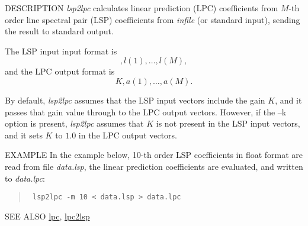 \begin{synopsis}
\item [lsp2lpc] [ --m $M$ ] [ --s $S$ ] [ --k ] [ --L ] [ --q $Q$ ] [ {\em infile} ] 
\end{synopsis}

\begin{qsection}{DESCRIPTION}
{\em lsp2lpc} calculates linear prediction (LPC) coefficients 
from $M$-th order line spectral pair (LSP) coefficients 
from {\em infile} (or standard input),
sending the result to standard output.

The LSP input input format is
\begin{displaymath}
   [ K ], l(1), \dots , l(M), 
\end{displaymath}
and the LPC output format is
\begin{displaymath}
   K , a(1), \dots , a(M).
\end{displaymath}

By default, {\em lsp2lpc} assumes that 
the LSP input vectors include the gain $K$, 
and it passes that gain value through to the LPC output vectors.  
However, if the --k option is present, 
{\em lsp2lpc} assumes that $K$ is not present in the LSP input vectors, 
and it sets $K$ to $1.0$ in the LPC output vectors.
\end{qsection}

\begin{options}
\end{options}

\begin{qsection}{EXAMPLE}
In the example below, 10-th order LSP coefficients in float format
are read from file {\em data.lsp}, the linear prediction coefficients
are evaluated, and written to {\em data.lpc}:
\begin{quote}
\verb! lsp2lpc -m 10 < data.lsp > data.lpc!
\end{quote}
\end{qsection}

\begin{qsection}{SEE ALSO}
\hyperlink{lpc}{lpc},
\hyperlink{lpc2lsp}{lpc2lsp}
\end{qsection}
